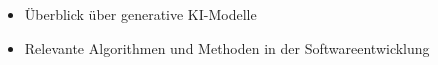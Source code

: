 \begin{itemize}
    \item Überblick über generative KI-Modelle
    \item Relevante Algorithmen und Methoden in der Softwareentwicklung
\end{itemize}